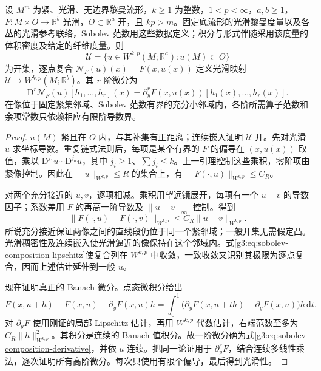 \begin{theorem}\label{g3:thm:sobolev-composition-smooth}
	设 \(M^m\) 为紧、光滑、无边界黎曼流形，\(k\ge1\) 为整数，\(1<p<\infty\)，\(a,b\ge1\)，\(F:M\times O\to\mathbb R^b\) 光滑，\(O\subset\mathbb R^a\) 开，且 \(kp>m\)。固定底流形的光滑黎曼度量以及各丛的光滑参考联络，Sobolev 范数用这些数据定义；积分与形式伴随采用该度量的体积密度及给定的纤维度量。则
	\[
		\mathcal U=\{u\in W^{k,p}(M;\mathbb R^a):u(M)\subset O\}
	\]
	为开集，逐点复合 \(\mathcal N_F(u)(x)=F(x,u(x))\) 定义光滑映射
	\(\mathcal U\to W^{k,p}(M;\mathbb R^b)\)。其 \(r\) 阶微分为
	\begin{equation}\label{g3:eq:sobolev-composition-derivative}
		\mathrm D^r\mathcal N_F(u)[h_1,\ldots,h_r](x)
		=\partial_y^rF(x,u(x))[h_1(x),\ldots,h_r(x)].
	\end{equation}
	在像位于固定紧集邻域、Sobolev 范数有界的充分小邻域内，各阶所需算子范数和余项常数只依赖相应有限阶导数界。
\end{theorem}
\begin{proof}
	\(u(M)\) 紧且在 \(O\) 内，与其补集有正距离；连续嵌入证明 \(\mathcal U\) 开。先对光滑 \(u\) 求坐标导数。重复链式法则后，每项是某个有界的 \(F\) 的偏导在 \((x,u(x))\) 取值，乘以
	\(\mathrm D^{j_1}u\cdots\mathrm D^{j_a}u\)，其中 \(j_i\ge1\)、\(\sum j_i\le k\)。上一引理控制这些乘积，零阶项由紧像控制。因此在 \(\|u\|_{W^{k,p}}\le R\) 的集合上，有 \(\|F(\cdot,u)\|_{W^{k,p}}\le C_R\)。

	对两个充分接近的 \(u,v\)，逐项相减。乘积用望远镜展开，每项有一个 \(u-v\) 的导数因子；系数差用 \(F\) 的再高一阶导数及 \(\|u-v\|_\infty\) 控制。得到
	\begin{equation}\label{g3:eq:sobolev-composition-lipschitz}
		\|F(\cdot,u)-F(\cdot,v)\|_{W^{k,p}}
		\le C_R\|u-v\|_{W^{k,p}}.
	\end{equation}
	所说充分接近保证两像之间的直线段仍位于同一个紧邻域；一般开集无需假定凸。光滑稠密性及连续嵌入使光滑逼近的像保持在这个邻域内。式\eqref{g3:eq:sobolev-composition-lipschitz}使复合列在 \(W^{k,p}\) 中收敛，一致收敛又识别其极限为逐点复合，因而上述估计延伸到一般 \(u\)。

	现在证明真正的 Banach 微分。点态微积分给出
	\[
		F(x,u+h)-F(x,u)-\partial_yF(x,u)h
		=\int_0^1\bigl(\partial_yF(x,u+th)-\partial_yF(x,u)\bigr)h\,\mathrm dt.
	\]
	对 \(\partial_yF\) 使用刚证的局部 Lipschitz 估计，再用 \(W^{k,p}\) 代数估计，右端范数至多为 \(C_R\|h\|_{W^{k,p}}^2\)。其积分是连续的 Banach 值积分。故一阶微分确为式\eqref{g3:eq:sobolev-composition-derivative}，并依 \(u\) 连续。把同一论证用于 \(\partial_y^rF\)，结合连续多线性乘法，逐次证明所有高阶微分。每次只使用有限个偏导，最后得到光滑性。
\end{proof}

